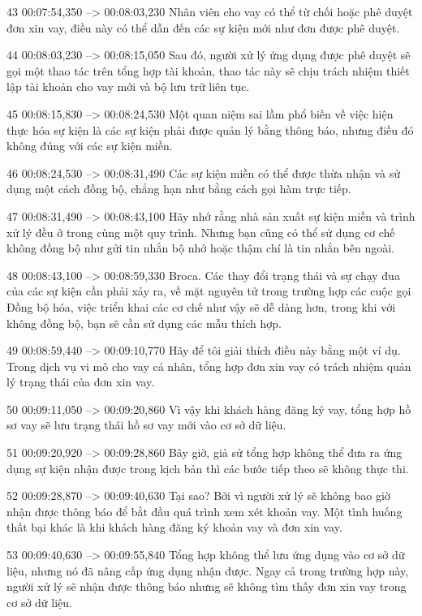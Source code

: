43
00:07:54,350 --> 00:08:03,230
Nhân viên cho vay có thể từ chối hoặc phê duyệt đơn xin vay, điều này có thể dẫn đến các sự kiện mới như đơn được phê duyệt.

44
00:08:03,230 --> 00:08:15,050
Sau đó, người xử lý ứng dụng được phê duyệt sẽ gọi một thao tác trên tổng hợp tài khoản, thao tác này sẽ chịu trách nhiệm thiết lập tài khoản cho vay mới và bộ lưu trữ liên tục.

45
00:08:15,830 --> 00:08:24,530
Một quan niệm sai lầm phổ biến về việc hiện thực hóa sự kiện là các sự kiện phải được quản lý bằng thông báo, nhưng điều đó không đúng với các sự kiện miền.

46
00:08:24,530 --> 00:08:31,490
Các sự kiện miền có thể được thừa nhận và sử dụng một cách đồng bộ, chẳng hạn như bằng cách gọi hàm trực tiếp.

47
00:08:31,490 --> 00:08:43,100
Hãy nhớ rằng nhà sản xuất sự kiện miền và trình xử lý đều ở trong cùng một quy trình.  Nhưng bạn cũng có thể sử dụng cơ chế không đồng bộ như gửi tin nhắn bộ nhớ hoặc thậm chí là tin nhắn bên ngoài.

48
00:08:43,100 --> 00:08:59,330
Broca.  Các thay đổi trạng thái và sự chạy đua của các sự kiện cần phải xảy ra, về mặt nguyên tử trong trường hợp các cuộc gọi Đồng bộ hóa, việc triển khai các cơ chế như vậy sẽ dễ dàng hơn, trong khi với không đồng bộ, bạn sẽ cần sử dụng các mẫu thích hợp.

49
00:08:59,440 --> 00:09:10,770
Hãy để tôi giải thích điều này bằng một ví dụ.  Trong dịch vụ vi mô cho vay cá nhân, tổng hợp đơn xin vay có trách nhiệm quản lý trạng thái của đơn xin vay.

50
00:09:11,050 --> 00:09:20,860
Vì vậy khi khách hàng đăng ký vay, tổng hợp hồ sơ vay sẽ lưu trạng thái hồ sơ vay mới vào cơ sở dữ liệu.

51
00:09:20,920 --> 00:09:28,860
Bây giờ, giả sử tổng hợp không thể đưa ra ứng dụng sự kiện nhận được trong kịch bản thì các bước tiếp theo sẽ không thực thi.

52
00:09:28,870 --> 00:09:40,630
Tại sao?  Bởi vì người xử lý sẽ không bao giờ nhận được thông báo để bắt đầu quá trình xem xét khoản vay.  Một tình huống thất bại khác là khi khách hàng đăng ký khoản vay và đơn xin vay.

53
00:09:40,630 --> 00:09:55,840
Tổng hợp không thể lưu ứng dụng vào cơ sở dữ liệu, nhưng nó đã nâng cấp ứng dụng nhận được.  Ngay cả trong trường hợp này, người xử lý sẽ nhận được thông báo nhưng sẽ không tìm thấy đơn xin vay trong cơ sở dữ liệu.

